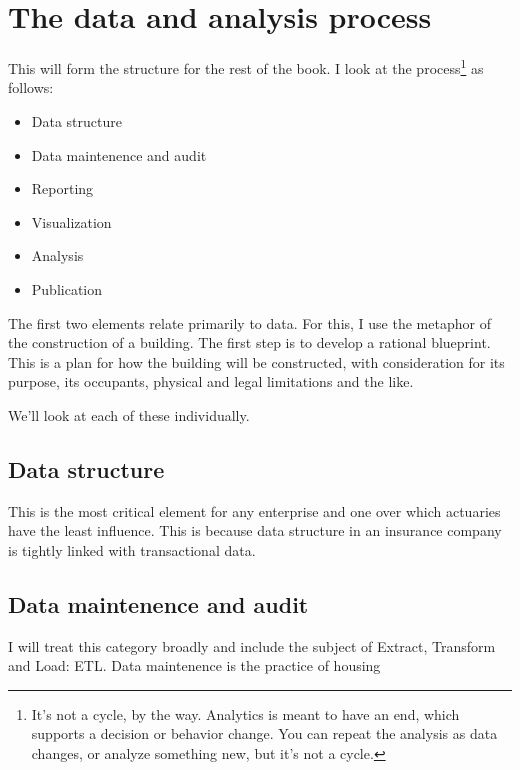 \chapter{The data and analysis process}
This will form the structure for the rest of the book. I look at the process\footnote{It's not a cycle, by the way. Analytics is meant to have an end, which supports a decision or behavior change. You can repeat the analysis as data changes, or analyze something new, but it's not a cycle.} as follows:
\begin{itemize}
\item{Data structure}
\item{Data maintenence and audit}
\item{Reporting}
\item{Visualization}
\item{Analysis}
\item{Publication}
\end{itemize}

The first two elements relate primarily to data. For this, I use the metaphor of the construction of a building. The first step is to develop a rational blueprint. This is a plan for how the building will be constructed, with consideration for its purpose, its occupants, physical and legal limitations and the like.

We'll look at each of these individually.
\section{Data structure}
This is the most critical element for any enterprise and one over which actuaries have the least influence. This is because data structure in an insurance company is tightly linked with transactional data. 

\section{Data maintenence and audit}
I will treat this category broadly and include the subject of Extract, Transform and Load: ETL. Data maintenence is the practice of housing 